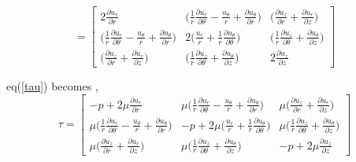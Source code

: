 \documentclass{article}
\begin{document}
\begin{equation}
[\nabla u + (\nabla u)^T] =
\begin{bmatrix}
2\frac{\partial u_{r}}{\partial r}   &  \bigg(\frac{1}{r}\frac{\partial u_{r}}{\partial \theta} -\frac{u_{\theta}}{r}+\frac{\partial u_{\theta}}{\partial r}\bigg) & \bigg(\frac{\partial u_{z}}{\partial r} + \frac{\partial u_{r}}{\partial z}\bigg) \\
\bigg(\frac{1}{r}\frac{\partial u_{r}}{\partial \theta} -\frac{u_{\theta}}{r}+\frac{\partial u_{\theta}}{\partial r}\bigg) & 2\bigg(\frac{u_{r}}{r}+\frac{1}{r}\frac{\partial u_{\theta}}{\partial \theta}\bigg)  & \bigg(\frac{1}{r}\frac{\partial u_{z}}{\partial \theta} + \frac{\partial u_{\theta}}{\partial z}\bigg) \\
\bigg(\frac{\partial u_{z}}{\partial r} + \frac{\partial u_{r}}{\partial z}\bigg) &  \bigg(\frac{1}{r}\frac{\partial u_{z}}{\partial \theta} + \frac{\partial u_{\theta}}{\partial z}\bigg) & 2\frac{\partial u_{z}}{\partial z}
\end{bmatrix} 
\end{equation}

\therefore eq(\ref{tau}) becomes ,
\begin{equation}
\tau =
\begin{bmatrix}
-p + 2\mu \frac{\partial u_{r}}{\partial r}   &  \mu \bigg(\frac{1}{r}\frac{\partial u_{r}}{\partial \theta} -\frac{u_{\theta}}{r}+\frac{\partial u_{\theta}}{\partial r}\bigg) & \mu \bigg(\frac{\partial u_{z}}{\partial r} + \frac{\partial u_{r}}{\partial z}\bigg) \\
\mu \bigg(\frac{1}{r}\frac{\partial u_{r}}{\partial \theta} -\frac{u_{\theta}}{r}+\frac{\partial u_{\theta}}{\partial r}\bigg) & -p + 2\mu \bigg(\frac{u_{r}}{r}+\frac{1}{r}\frac{\partial u_{\theta}}{\partial \theta}\bigg)  & \mu \bigg(\frac{1}{r}\frac{\partial u_{z}}{\partial \theta} + \frac{\partial u_{\theta}}{\partial z}\bigg) \\
\mu \bigg(\frac{\partial u_{z}}{\partial r} + \frac{\partial u_{r}}{\partial z}\bigg) &  \mu \bigg(\frac{1}{r}\frac{\partial u_{z}}{\partial \theta} + \frac{\partial u_{\theta}}{\partial z}\bigg) & -p + 2\mu \frac{\partial u_{z}}{\partial z}
\end{bmatrix} 
\end{equation}
\end{document}
